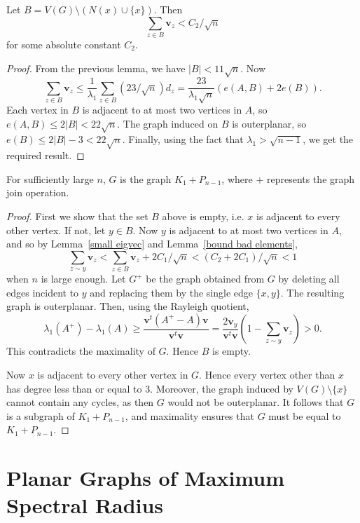 \begin{lemma}\label{bound bad elements}
 Let $B = V(G) \setminus (N(x) \cup \{x\})$.  Then
  \[ \sum_{z \in B} \mathbf{v}_z < C_2 / \sqrt{n} \]
 for some absolute constant $C_2$.
\end{lemma}
\begin{proof}
From the previous lemma, we have $|B| < 11 \sqrt{n}$.  Now
 \[ \sum_{z \in B} \mathbf{v}_z \leq \frac{1}{\lambda_1} \sum_{z \in B} \left(23 / \sqrt{n}\right) d_z = \frac{23}{\lambda_1 \sqrt{n}} \left( e(A,B) + 2 e(B)\right) . \]
Each vertex in $B$ is adjacent to at most two vertices in $A$, so $e(A,B) \leq 2 |B| < 22 \sqrt{n}$.  The graph induced on $B$ is outerplanar, so
$e(B) \leq 2|B| - 3 < 22 \sqrt{n}$.  Finally, using the fact that $\lambda_1 > \sqrt{n-1}$, we get the required result.
\end{proof}

\begin{theorem}
 For sufficiently large $n$, $G$ is the graph $K_1 + P_{n-1}$, where $+$ represents the graph join operation.
\end{theorem}
\begin{proof}
First we show that the set $B$ above is empty, i.e. $x$ is adjacent
to every other vertex.  If not, let $y \in B$.  Now $y$ is adjacent to at
most two vertices in $A$, and so by Lemma~\ref{small eigvec} and Lemma~\ref{bound bad elements}, 
 \[ \sum_{z \sim y} \mathbf{v}_z < \sum_{z \in B} \mathbf{v}_z + 2 C_1 / \sqrt{n} < (C_2 + 2 C_1) / \sqrt{n} < 1\]
when $n$ is large enough.  Let $G^+$ be the graph obtained
from $G$ by deleting all edges incident to $y$ and replacing them by the single edge $\{x,y\}$.  The resulting graph is outerplanar.  Then,
using the Rayleigh quotient,
 \[ \lambda_1(A^+) - \lambda_1(A) \geq \frac{\textbf{v}^t(A^+ - A)\textbf{v}}{\textbf{v}^t\textbf{v}} = \frac{2\mathbf{v}_y}{\textbf{v}^t\textbf{v}} \left(1 - \sum_{z \sim y} \mathbf{v}_z\right) > 0.\]
This contradicts the maximality of $G$.  Hence $B$ is empty.


Now $x$ is adjacent to every other vertex in $G$.  Hence every vertex other than $x$ has degree less than or equal to $3$.  Moreover, the graph induced by 
$V(G) \setminus \{x\}$ cannot contain any cycles, as then $G$ would not be outerplanar.
It follows that $G$ is a subgraph of $K_1 + P_{n-1}$, and maximality ensures that $G$ must be equal to $K_1 + P_{n-1}$.
\end{proof}


\section{Planar Graphs of Maximum Spectral Radius}\label{planar}

